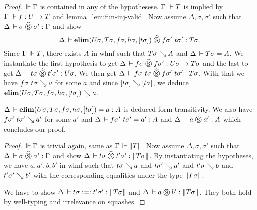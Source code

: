 \documentclass[a4paper,english]{lipics-utf8x}
\begin{document}
  \begin{proof}
    $\,\Vdash \Gamma$ is contained in any of the hypothesese.
    $\Gamma \,\Vdash T$ is implied by $\Gamma \,\Vdash f : U \to T$ and
    lemma~\ref{lem:fun-inj-valid}.
    Now assume $\Delta, \sigma, \sigma'$ such that
    $\Delta \,\vdash \sigma \mathrel{\widehat{\mathrel{\circledS}}} \sigma' : \Gamma$ and
    show
    \[\Delta \,\vdash \operatorname{\mathbf{elim}}(U \sigma,T \sigma,f \sigma,h \sigma,[t \sigma]) \mathrel{\widehat{\mathrel{\circledS}}}
    f \sigma'\ t \sigma' : T \sigma.\]
    Since $\Gamma \,\Vdash T$, there exists $A$ in whnf such that $T \sigma \searrow A$
    and $\Delta \,\vdash T \sigma = A$.
    We instantiate the first hypothesis to get
    $\Delta \,\vdash f \sigma \mathrel{\widehat{\mathrel{\circledS}}} f \sigma' : U \sigma \to T \sigma$
    and the last to get
    $\Delta \,\vdash t \sigma \mathrel{\widehat{\mathrel{\circledS}}} t' \sigma' : U \sigma$.
    We then get
    $\Delta \,\vdash f \sigma\ t \sigma \mathrel{\widehat{\mathrel{\circledS}}} f \sigma'\ t \sigma' : T \sigma$.
    With that we have $f \sigma\ t \sigma \searrow a$ for some $a$ and since
    $[t \sigma] \searrow [t \sigma]$, we deduce
    $\operatorname{\mathbf{elim}}(U \sigma,T \sigma,f \sigma,h \sigma,[t \sigma]) \searrow a$.

    \noindent %
    $\Delta \,\vdash \operatorname{\mathbf{elim}}(U \sigma,T \sigma,f \sigma,h \sigma,[t \sigma]) = a : A$
    is deduced form transitivity.
    We also have $f \sigma'\ t \sigma' \searrow a'$ for some $a'$ and
    $\Delta \,\vdash f \sigma'\ t \sigma' = a' : A$
    and $\Delta \,\vdash a \mathrel{\circledS} a' : A$ which concludes our proof.
  \end{proof}

  \begin{lemma}
    \leavevmode
    \begin{mathc}
    \end{mathc}
  \end{lemma}

  \begin{proof}
    $\,\Vdash \Gamma$ is trivial again, same as $\Gamma \,\Vdash \|T\|$.
    Now assume $\Delta, \sigma, \sigma'$ such that
    $\Delta \,\vdash \sigma \mathrel{\widehat{\mathrel{\circledS}}} \sigma' : \Gamma$ and
    show $\Delta \,\vdash t \sigma \mathrel{\widehat{\mathrel{\circledS}}} t' \sigma' : \|T \sigma\|$.
    By instantiating the hypotheses, we have $a,a',b,b'$ in whnf such that
    $t \sigma \searrow a$ and $t \sigma' \searrow a'$ and $t' \sigma \searrow b$
    and $t' \sigma' \searrow b'$ with the corresponding equalities under the type
    $\|T \sigma\|$.

    We have to show $\Delta \,\vdash t \sigma :=: t' \sigma' : \|T \sigma\|$
    and $\Delta \,\vdash a \mathrel{\circledS} b' : \|T \sigma\|$. They both hold by
    well-typing and irrelevance on squashes.
  \end{proof}
\end{document}
